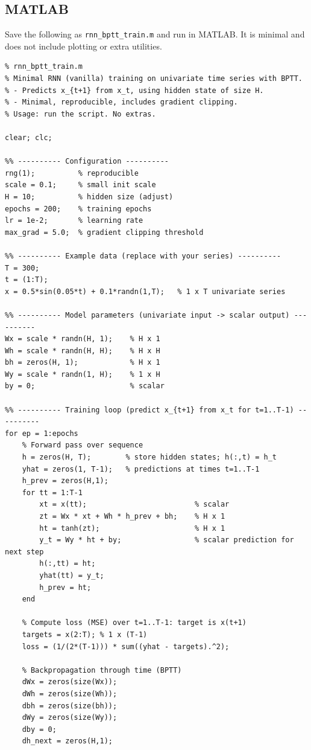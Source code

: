 \documentclass[11pt,a4paper]{article}
\begin{document}
\subsection*{ MATLAB }

Save the following as \texttt{rnn\_bptt\_train.m} and run in MATLAB. It is
minimal and does not include plotting or extra utilities.

\begin{verbatim}
% rnn_bptt_train.m
% Minimal RNN (vanilla) training on univariate time series with BPTT.
% - Predicts x_{t+1} from x_t, using hidden state of size H.
% - Minimal, reproducible, includes gradient clipping.
% Usage: run the script. No extras.

clear; clc;

%% ---------- Configuration ----------
rng(1);          % reproducible
scale = 0.1;     % small init scale
H = 10;          % hidden size (adjust)
epochs = 200;    % training epochs
lr = 1e-2;       % learning rate
max_grad = 5.0;  % gradient clipping threshold

%% ---------- Example data (replace with your series) ----------
T = 300;
t = (1:T);
x = 0.5*sin(0.05*t) + 0.1*randn(1,T);   % 1 x T univariate series

%% ---------- Model parameters (univariate input -> scalar output) ----------
Wx = scale * randn(H, 1);    % H x 1
Wh = scale * randn(H, H);    % H x H
bh = zeros(H, 1);            % H x 1
Wy = scale * randn(1, H);    % 1 x H
by = 0;                      % scalar

%% ---------- Training loop (predict x_{t+1} from x_t for t=1..T-1) ----------
for ep = 1:epochs
    % Forward pass over sequence
    h = zeros(H, T);        % store hidden states; h(:,t) = h_t
    yhat = zeros(1, T-1);   % predictions at times t=1..T-1
    h_prev = zeros(H,1);
    for tt = 1:T-1
        xt = x(tt);                         % scalar
        zt = Wx * xt + Wh * h_prev + bh;    % H x 1
        ht = tanh(zt);                      % H x 1
        y_t = Wy * ht + by;                 % scalar prediction for next step
        h(:,tt) = ht;
        yhat(tt) = y_t;
        h_prev = ht;
    end

    % Compute loss (MSE) over t=1..T-1: target is x(t+1)
    targets = x(2:T); % 1 x (T-1)
    loss = (1/(2*(T-1))) * sum((yhat - targets).^2);

    % Backpropagation through time (BPTT)
    dWx = zeros(size(Wx));
    dWh = zeros(size(Wh));
    dbh = zeros(size(bh));
    dWy = zeros(size(Wy));
    dby = 0;
    dh_next = zeros(H,1);


\end{verbatim}
\end{document}
